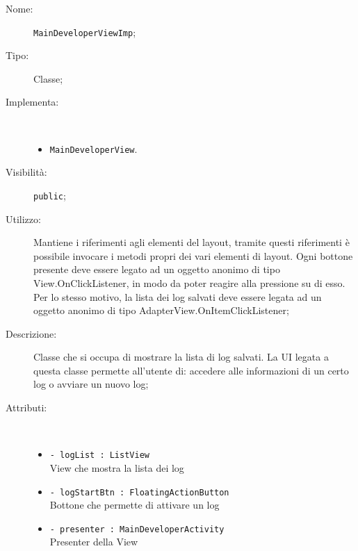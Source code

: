 \documentclass[../DefinizioneDiProdotto.tex]{subfiles}
\begin{document}
\begin{description}
	\item[Nome:] \texttt{MainDeveloperViewImp};
	\item[Tipo:] Classe;
	\item[Implementa:] \
	\begin{itemize}
		\item \texttt{MainDeveloperView}.
		
	\end{itemize}
	\item[Visibilità:] \texttt{public};
	\item[Utilizzo:] Mantiene i riferimenti agli elementi del layout, tramite questi riferimenti è possibile invocare i metodi propri dei vari elementi di layout.
	Ogni bottone presente deve essere legato ad un oggetto anonimo di tipo View.OnClickListener, in modo da poter reagire alla pressione su di esso. Per lo stesso motivo, la lista dei log salvati deve essere legata ad un oggetto anonimo di tipo AdapterView.OnItemClickListener;
	\item[Descrizione:] Classe che si occupa di mostrare la lista di log salvati. La UI legata a questa classe permette all'utente di: accedere alle informazioni di un certo log o avviare un nuovo log;
	\item[Attributi:] \
	\begin{itemize}
		\item \texttt{- logList : ListView}\\
		View che mostra la lista dei log
		
		\item \texttt{- logStartBtn : FloatingActionButton}\\
		Bottone che permette di attivare un log
		
		\item \texttt{- presenter : MainDeveloperActivity}\\
		Presenter della View
		

\end{itemize}
\end{description}
\end{document}
